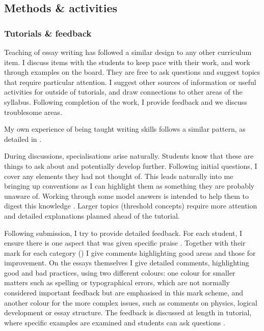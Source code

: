 \subsection{Methods \& activities}\label{sec:essay-methods}

\subsubsection{Tutorials \& feedback}

Teaching of essay writing has followed a similar design to any other curriculum item. I discuss items with the students to keep pace with their work, and work through examples on the board. They are free to ask questions and suggest topics that require particular attention. I suggest other sources of information or useful activities for outside of tutorials, and draw connections to other areas of the syllabus. Following completion of the work, I provide feedback and we discuss troublesome areas.

My own experience of being taught writing skills follows a similar pattern, as detailed in .

During discussions, specialisations arise naturally. Students know that these are things to ask about and potentially develop further. Following initial questions, I cover any elements they had not thought of. This leads naturally into me bringing up conventions as I can highlight them as something they are probably unaware of. Working through some model answers is intended to help them to digest this knowledge \citep[chapter 10]{Ramsden1992}. Larger topics (threshold concepts) require more attention and detailed explanations planned ahead of the tutorial.

Following submission, I try to provide detailed feedback. For each student, I ensure there is one aspect that was given specific praise \citep{Henderlong2002}. Together with their mark for each category () I give comments highlighting good areas and those for improvement. On the essays themselves I give detailed comments, highlighting good and bad practices, using two different colours: one colour for smaller matters such as spelling or typographical errors, which are not normally considered important feedback \citep[chapter 4]{Irons2008} but are emphasised in this mark scheme, and another colour for the more complex issues, such as comments on physics, logical development or essay structure. The feedback is discussed at length in tutorial, where specific examples are examined and students can ask questions \citep[chapter 2]{Irons2008}.

